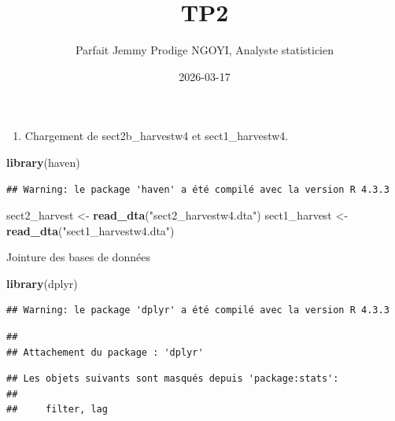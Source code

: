 \documentclass[
]{article}
\title{TP2}
\author{Parfait Jemmy Prodige NGOYI, Analyste statisticien}
\date{2026-03-17}
\newenvironment{Shaded}{\begin{snugshade}}{\end{snugshade}}
\newcommand{\FunctionTok}[1]{\textcolor[rgb]{0.13,0.29,0.53}{\textbf{#1}}}
\newcommand{\NormalTok}[1]{#1}
\newcommand{\OtherTok}[1]{\textcolor[rgb]{0.56,0.35,0.01}{#1}}
\newcommand{\StringTok}[1]{\textcolor[rgb]{0.31,0.60,0.02}{#1}}
\providecommand{\tightlist}{%
  \setlength{\itemsep}{0pt}\setlength{\parskip}{0pt}}
\begin{document}
\maketitle

\begin{enumerate}
\def\labelenumi{\arabic{enumi}.}
\setcounter{enumi}{6}
\tightlist
\item
  Chargement de sect2b\_harvestw4 et sect1\_harvestw4.
\end{enumerate}

\begin{Shaded}
\begin{Highlighting}[]
\FunctionTok{library}\NormalTok{(haven)}
\end{Highlighting}
\end{Shaded}

\begin{verbatim}
## Warning: le package 'haven' a été compilé avec la version R 4.3.3
\end{verbatim}

\begin{Shaded}
\begin{Highlighting}[]
\NormalTok{sect2\_harvest }\OtherTok{\textless{}{-}} \FunctionTok{read\_dta}\NormalTok{(}\StringTok{"sect2\_harvestw4.dta"}\NormalTok{)}
\NormalTok{sect1\_harvest }\OtherTok{\textless{}{-}} \FunctionTok{read\_dta}\NormalTok{(}\StringTok{"sect1\_harvestw4.dta"}\NormalTok{)}
\end{Highlighting}
\end{Shaded}

Jointure des bases de données

\begin{Shaded}
\begin{Highlighting}[]
\FunctionTok{library}\NormalTok{(dplyr)}
\end{Highlighting}
\end{Shaded}

\begin{verbatim}
## Warning: le package 'dplyr' a été compilé avec la version R 4.3.3
\end{verbatim}

\begin{verbatim}
## 
## Attachement du package : 'dplyr'
\end{verbatim}

\begin{verbatim}
## Les objets suivants sont masqués depuis 'package:stats':
## 
##     filter, lag
\end{verbatim}
\end{document}
